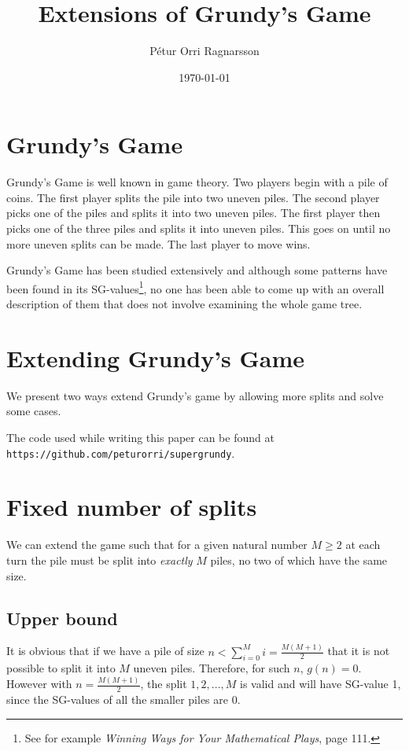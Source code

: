\documentclass[english,a4paper,twoside]{amsart}
\theoremstyle{lemma}
\begin{document}
\title[exesefsfe]{Extensions of Grundy's Game}

\author{Pétur Orri Ragnarsson}

\date{\today}

\maketitle

\thispagestyle{empty}

\section{Grundy's Game}
Grundy's Game is well known in game theory. Two players begin with a pile of coins.
The first player splits the pile into two uneven piles. The second player picks one of the
piles and splits it into two uneven piles. The first player then picks one of the three piles
and splits it into uneven piles. This goes on until no more uneven splits can be made. The
last player to move wins.

Grundy's Game has been studied extensively and although some patterns have been found
in its SG-values\footnote{See for example \emph{Winning Ways for Your Mathematical Plays}, page 111.},
no one has been able to come up with an overall description of them
that does not involve examining the whole game tree.

\section{Extending Grundy's Game}
We present two ways extend Grundy's game by allowing more splits and solve some cases.

The code used while writing this paper can be found at
\verb+https://github.com/peturorri/supergrundy+.

\section{Fixed number of splits}
We can extend the game such that for a given natural number $M \geq 2$ at each turn the
pile must be split into \emph{exactly} $M$ piles, no two of which have the same size.

\subsection{Upper bound}
It is obvious that if we have a pile of size $n < \sum_{i=0}^{M} i = \frac{M(M+1)}{2}$ that it is
not possible to split it into $M$ uneven piles. Therefore, for such $n$, $g(n) = 0$.
However with $n = \frac{M(M+1)}{2}$, the split $1, 2, ..., M$ is valid and will have SG-value 1,
since the SG-values of all the smaller piles are 0.
\end{document}
